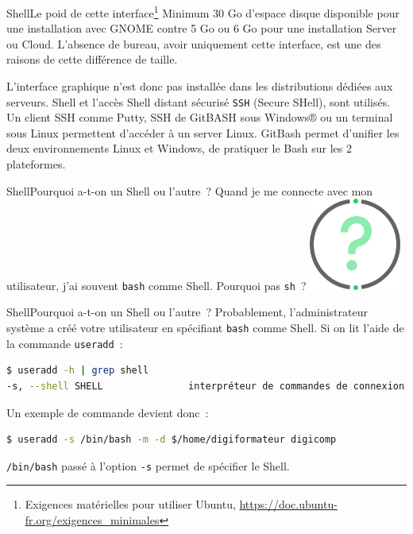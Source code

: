 \documentclass{beamer}
\begin{document}
    \begin{frame}{Shell}{Le poid de cette interface\footnote{Exigences matérielles pour utiliser Ubuntu, \url{https://doc.ubuntu-fr.org/exigences_minimales}}}
        Minimum 30 Go d'espace disque disponible pour une installation avec GNOME contre 5 Go ou 6 Go pour une installation Server ou Cloud.
        \bigbreak
        L'absence de bureau, avoir uniquement cette interface, est une des raisons de cette différence de taille.

        L'interface graphique n'est donc pas installée dans les distributions dédiées aux serveurs.
        Shell et l'accès Shell distant sécurisé \lstinline{SSH} (Secure SHell), sont utilisés.
        Un client SSH comme Putty, SSH de GitBASH sous Windows® ou un terminal sous Linux permettent d'accéder à un server Linux.
        \bigbreak
        GitBash permet d'unifier les deux environnements Linux et Windows, de pratiquer le Bash sur les 2 plateformes.
    \end{frame}

    \begin{frame}{Shell}{Pourquoi a-t-on un Shell ou l'autre~?}
        Quand je me connecte avec mon utilisateur, j'ai souvent \lstinline{bash} comme Shell.
        Pourquoi pas \lstinline{sh}~?
        \bigbreak
        \centering
        \includegraphics[width=3cm]{image/question-mark}
    \end{frame}

    \begin{frame}[fragile]{Shell}{Pourquoi a-t-on un Shell ou l'autre~?}
        Probablement, l'administrateur système a créé votre utilisateur en spécifiant \lstinline{bash} comme Shell.
        \bigbreak
        Si on lit l'aide de la commande \lstinline{useradd}~:
        \begin{lstlisting}[language=bash]
$ useradd -h | grep shell
-s, --shell SHELL               interpréteur de commandes de connexion du nouveau compte
        \end{lstlisting}
        \bigbreak
        Un exemple de commande devient donc~:
        \begin{lstlisting}[language=bash]
$ useradd -s /bin/bash -m -d $/home/digiformateur digicomp
        \end{lstlisting}
        \bigbreak
        \lstinline{/bin/bash} passé à l'option \lstinline{-s} permet de spécifier le Shell.
    \end{frame}
\end{document}
